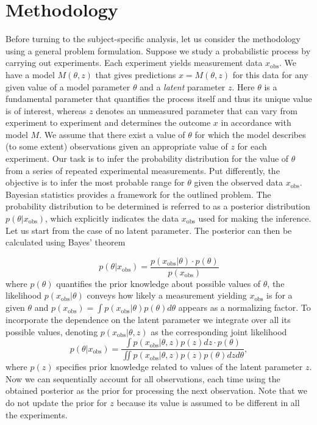 \documentclass[%
 reprint,
 amsmath,amssymb,
 aps,
]{revtex4-2}
\begin{document}
\section{Methodology} \label{sec:methodology} 
Before turning to the subject-specific analysis, let us consider the methodology using a general problem formulation. Suppose we study a probabilistic process by carrying out experiments. Each experiment yields measurement data $x_{\text{obs}}$. We have a model $M(\theta, z)$ that gives predictions $x = M(\theta, z)$ for this data for any given value of a model parameter $\theta$ and a \textit{latent} parameter $z$. Here $\theta$ is a fundamental parameter that quantifies the process itself and thus its unique value is of interest, whereas $z$ denotes an unmeasured parameter that can vary from experiment to experiment and determines the outcome $x$ in accordance with model $M$. We assume that there exist a value of $\theta$ for which the model describes (to some extent) observations given an appropriate value of $z$ for each experiment. Our task is to infer the probability distribution for the value of $\theta$ from a series of repeated experimental measurements. Put differently, the objective is to infer the most probable range for $\theta$ given the observed data $x_{\text{obs}}$. Bayesian statistics provides a framework for the outlined problem. The probability distribution to be determined is referred to as a posterior distribution $p(\theta|x_{\text{obs}})$, which explicitly indicates the data $x_{\text{obs}}$ used for making the inference. Let us start from the case of no latent parameter. The posterior can then be calculated using Bayes' theorem

\begin{equation} \label{eq:BayesPosterior}
    p(\theta | x_{\text{obs}}) = \frac{p(x_{\text{obs}}|\theta) \cdot p(\theta)}{p(x_{\text{obs}})}
\end{equation}
where $p(\theta)$ quantifies the prior knowledge about possible values of $\theta$, the likelihood $p(x_{\text{obs}}|\theta)$ conveys how likely a measurement yielding $x_{\text{obs}}$ is for a given $\theta$ and $p(x_{\text{obs}}) = \int p(x_{\text{obs}}|\theta) p(\theta) d\theta$ appears as a normalizing factor. To incorporate the dependence on the latent parameter we integrate over all its possible values, denoting $p(x_{\text{obs}}|\theta, z)$ as the corresponding joint likelihood
\begin{equation} \label{eq:BayesPosteriorZ}
    p(\theta | x_{\text{obs}}) = \frac{ \int p(x_{\text{obs}}|\theta, z) p(z) dz \cdot p(\theta)}{\iint p(x_{\text{obs}}|\theta, z) p(z) p(\theta) dz d\theta},
\end{equation}
where $p(z)$ specifies prior knowledge related to values of the latent parameter $z$. Now we can sequentially account for all observations, each time using the obtained posterior as the prior for processing the next observation. Note that we do not update the prior for $z$ because its value is assumed to be different in all the experiments. \\
\end{document}

